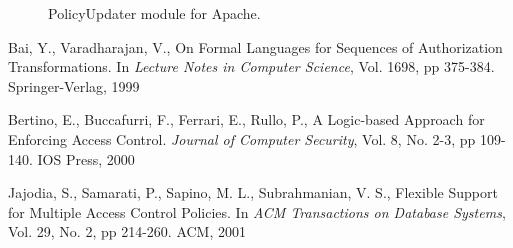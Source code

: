 \documentclass{llncs}
\begin{document}

    \begin{figure}[h]
      \begin{center}
        \caption{PolicyUpdater module for Apache.}
        \label{fig-1}
      \end{center}
    \end{figure}

  \begin{thebibliography}{5}
      Bai, Y., Varadharajan, V.,
      On Formal Languages for Sequences of Authorization Transformations.
      In \emph{Lecture Notes in Computer Science},
      Vol. 1698,
      pp 375-384.
      Springer-Verlag, 1999

      Bertino, E., Buccafurri, F., Ferrari, E., Rullo, P.,
      A Logic-based Approach for Enforcing Access Control.
      \emph{Journal of Computer Security},
      Vol. 8, No. 2-3,
      pp 109-140.
      IOS Press, 2000

      Jajodia, S., Samarati, P., Sapino, M. L., Subrahmanian, V. S.,
      Flexible Support for Multiple Access Control Policies.
      In \emph{ACM Transactions on Database Systems},
      Vol. 29, No. 2,
      pp 214-260.
      ACM, 2001
  \end{thebibliography}
\end{document}
